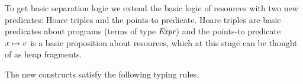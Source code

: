 \newcommand{\htrectemp}[1][]
{\htrecgen[-temp#1]{ }}
\newcommand{\htproj}[1][]
{\rulegen[#1]{Ht-Proj}
  { }
  { S \proves \hoare{\TRUE }{\Proj{i} (v_1,v_2) }{v . v = v_i}}}
\newcommand{\htmatchgen}[2][]
{\rulegen[#1]{Ht-Match}
  { S \proves \hoare{P}{e_i\left[u/x_i\right]}{v.Q}}
  { S \proves \hoare{#2 P}{\Match{\Inj{i} u}with{\Inj{1}x_1}=>{e_1}|{\Inj{2}x_2}=>{e_2}end}{v.Q}}}
\newcommand{\htmatchtemp}[1][]
{\htmatchgen[-temp#1]{ }}
\newcommand{\htifgen}[2][]
{\rulegen[#1]{Ht-If}
  { \hoare{P * b = \True}{e_2}{u.Q} \and
    \hoare{P * b = \False}{e_3}{u.Q} }
  { \hoare{#2 P}{\If b then e_2 \Else e_3}{u.Q} }}
\newcommand{\htiftemp}[1][]
{\htifgen[-temp#1]{ }}
\newcommand{\hteq}[1][]
{\rulegen[#1]{Ht-Eq}
  {S \land t =_\tau t' \proves \hoare{P}{\expr}{v.Q}}
  {S \proves \hoare{P \land t =_\tau t'}{\expr}{v.Q}}}
\newcommand{\htht}[1][]
{\rulegen[#1]{Ht-Ht}
  {S \land \hoare{P_1}{\expr_1}{v.Q_1} \proves \hoare{P_2}{\expr_2}{v.Q_2}}
  {S \proves \hoare{P_2 \land \hoare{P_1}{\expr_1}{v.Q_1}}{\expr_2}{v.Q_2}}}

\newcommand{\htletgen}[2][]
{\rulegen[#1]{Ht-let}
{ S \proves \hoare{P}{e_1}{x. #2 Q} \and
  S \proves \All v.\hoare{Q[v/x]}{e_2\left[v/x\right]}{u.R}}
{S \proves \hoare{P}{\Let x=e_1 in e_2}{u.R}}}
\newcommand{\htlettemp}[1][]
{\htletgen[-temp#1]{ }}
\newcommand{\htletdetgen}[2][]
{\rulegen[#1]{Ht-let-det}
  {S \proves \hoare{P}{e_1}{x . #2 x = v \land #2 Q} \and
      S \proves \hoare{Q[v/x]}{e_2\left[v/x\right]}{u.R}}
    {S \proves \hoare{P}{\Let x=e_1 in e_2}{u.R}}}
\newcommand{\htletdettemp}[1][]
{\htletdetgen[-temp#1]{ }}
\newcommand{\htseqgen}[2][]
{\rulegen[#1]{Ht-seq}
  { S \proves \hoare{P}{e_1}{v. #2 Q} \and
    S \proves \hoare{\Exists x. Q}{e_2}{u.R}}
  { S \proves \hoare{P}{e_1 ; e_2}{u.R}}}
\newcommand{\htseqtemp}[1][]
{\htseqgen[-temp#1]{ }}
\newcommand{\htbetagen}[3][]
{\rulegen[#1]{Ht-beta}
  {S \proves \hoare{P}{e\left[v/x\right]}{u.Q}[#3]}
  {S \proves \hoare{#2 P}{(\lambda x . e) v}{u.Q}[#3]}}
\newcommand{\htbeta}[1][]{\htbetagen[#1]{ }{ }}

To get basic separation logic we extend the basic logic of resources with two new predicates: Hoare triples and the points-to predicate.
Hoare triples are basic predicates about programs (terms of type $\kern-0.05em\textit{Expr}$) and the points-to predicate $x \mapsto v$ is a basic proposition about resources, which at this stage can be thought of as heap fragments.

The new constructs satisfy the following typing rules.

